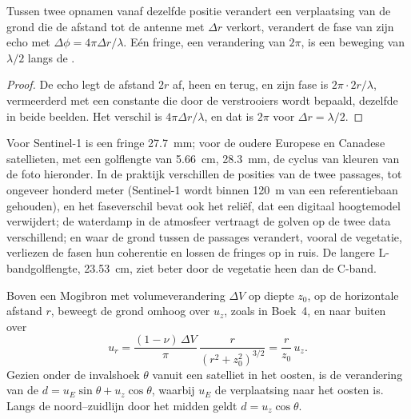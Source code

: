 \begin{theorem}\label{thm:b3:remote-sensing-gis:fringe}
Tussen twee opnamen vanaf dezelfde positie verandert een verplaatsing van de
grond die de afstand tot de antenne met $\Delta r$ verkort, verandert de
fase van zijn echo met $\Delta\phi = 4\pi\Delta r/\lambda$. Eén fringe, een
verandering van $2\pi$, is een beweging van $\lambda/2$ langs de .
\end{theorem}

\begin{proof}
De echo legt de afstand $2r$ af, heen en terug, en zijn fase is
$2\pi\cdot 2r/\lambda$, vermeerderd met een constante die door de verstrooiers wordt bepaald, dezelfde in
beide beelden. Het verschil is $4\pi\Delta r/\lambda$, en dat is $2\pi$
voor $\Delta r = \lambda/2$.
\end{proof}

Voor Sentinel-1 is een fringe \qty{27.7}{mm}; voor de oudere Europese en
Canadese satellieten, met een golflengte van \qty{5.66}{cm}, \qty{28.3}{mm}, de
cyclus van kleuren van de foto hieronder. In de praktijk verschillen de posities van de
twee passages, tot ongeveer honderd meter (Sentinel-1 wordt
binnen \qty{120}{m} van een referentiebaan gehouden), en het faseverschil
bevat ook het reliëf, dat een digitaal hoogtemodel verwijdert; de
waterdamp in de atmosfeer vertraagt de golven op de twee data verschillend;
en waar de grond tussen de passages verandert, vooral de vegetatie, verliezen de
fasen hun coherentie en lossen de fringes op in ruis. De langere
L-bandgolflengte, \qty{23.53}{cm}, ziet beter door de vegetatie heen dan de
C-band.

\begin{proposition}\label{prop:b3:remote-sensing-gis:mogi-los}
Boven een Mogibron met volumeverandering $\Delta V$ op diepte $z_0$, op de
horizontale afstand $r$, beweegt de grond omhoog over $u_z$, zoals in Boek~4,
en naar buiten over
\[
u_r = \frac{(1 - \nu)\,\Delta V}{\pi}\,\frac{r}{(r^2 + z_0^2)^{3/2}} = \frac{r}{z_0}\,u_z .
\]
Gezien onder de invalshoek $\theta$ vanuit een satelliet in het oosten, is de verandering
van de  $d = u_E\sin\theta + u_z\cos\theta$, waarbij $u_E$ de
verplaatsing naar het oosten is. Langs de noord--zuidlijn door het midden
geldt $d = u_z\cos\theta$.
\end{proposition}

